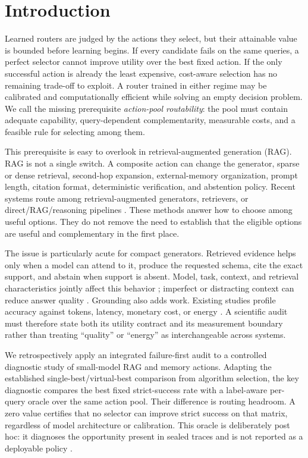 \section{Introduction}
\label{sec:introduction}

Learned routers are judged by the actions they select, but their attainable value
is bounded before learning begins. If every candidate fails on the same queries, a
perfect selector cannot improve utility over the best fixed action. If the only
successful action is already the least expensive, cost-aware selection has no
remaining trade-off to exploit. A router trained in either regime may be calibrated
and computationally efficient while solving an empty decision problem. We call the
missing prerequisite \emph{action-pool routability}: the pool must contain adequate
capability, query-dependent complementarity, measurable costs, and a feasible rule
for selecting among them.

This prerequisite is easy to overlook in retrieval-augmented generation (RAG).
RAG is not a single switch. A composite action can change the generator, sparse or
dense retrieval, second-hop expansion, external-memory organization, prompt length,
citation format, deterministic verification, and abstention policy. Recent systems
route among retrieval-augmented generators, retrievers, or direct/RAG/reasoning
pipelines \cite{ZhangEtAl2025RAGRouter,ZhaoEtAl2026R3AG,WangEtAl2026XRouter,
DingZhao2026RAGDiet}. These methods answer how to choose among useful options. They
do not remove the need to establish that the eligible options are useful and
complementary in the first place.

The issue is particularly acute for compact generators. Retrieved evidence helps
only when a model can attend to it, produce the requested schema, cite the exact
support, and abstain when support is absent. Model, task, context, and retrieval
characteristics jointly affect this behavior \cite{LiEtAl2025LaRA}; imperfect or
distracting context can reduce answer quality
\cite{OhThorne2023DetrimentalContexts,ParkLee2024RobustRALM}. Grounding also adds
work. Existing studies profile accuracy against tokens, latency, monetary cost, or
energy \cite{SchwartzEtAl2020GreenAI,HendersonEtAl2020EnergyReporting,
PanEtAl2025Electro,GuoEtAl2026RAGEnergy}. A scientific audit must therefore state
both its utility contract and its measurement boundary rather than treating
``quality'' or ``energy'' as interchangeable across systems.

We retrospectively apply an integrated failure-first audit to a controlled
diagnostic study of small-model RAG and memory actions. Adapting the established
single-best/virtual-best comparison from algorithm selection, the key diagnostic
compares the best fixed strict-success rate with a label-aware per-query oracle
over the same action pool. Their difference is routing headroom. A zero value
certifies that no selector can improve strict success on that matrix, regardless
of model architecture or calibration. This oracle is deliberately post hoc: it
diagnoses the opportunity present in sealed traces and is not reported as a
deployable policy \cite{Rice1976AlgorithmSelection,
LindauerEtAl2019AlgorithmSelection,LiEtAl2026LLMRouterBench}.

